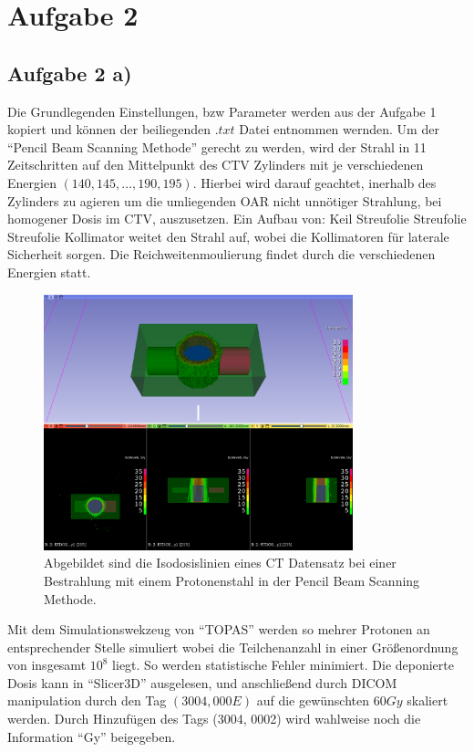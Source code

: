 \section{Aufgabe 2}
\subsection{Aufgabe 2 a)}
Die Grundlegenden Einstellungen, bzw Parameter werden aus der Aufgabe 1 kopiert und können der beiliegenden $.txt$ Datei entnommen wernden.
Um der \enquote{Pencil Beam Scanning Methode} gerecht zu werden, wird der Strahl in 11 Zeitschritten
auf den Mittelpunkt des CTV Zylinders mit je verschiedenen Energien $\left( 140, 145,...,190, 195 \right)$. 
Hierbei wird darauf geachtet, inerhalb des Zylinders zu agieren um die umliegenden OAR nicht unnötiger Strahlung, bei homogener Dosis im CTV, auszusetzen. 
Ein Aufbau von: \newpage Keil \to Streufolie \to Streufolie \to Streufolie \to Kollimator weitet den Strahl auf, wobei die Kollimatoren für laterale 
Sicherheit sorgen. Die Reichweitenmoulierung findet durch die verschiedenen Energien statt.
\begin{figure}
    \centering
    \includegraphics[width= 0.8\textwidth]{content/iso.png}
    \caption{Abgebildet sind die Isodosislinien eines CT Datensatz bei einer Bestrahlung mit einem Protonenstahl in der Pencil Beam Scanning
    Methode.}
    \label{fig:iso}
\end{figure}
Mit dem Simulationswekzeug von \enquote{TOPAS} werden so mehrer Protonen an entsprechender Stelle simuliert wobei die Teilchenanzahl in einer Größenordnung 
von insgesamt $10^8$ liegt. So werden statistische Fehler minimiert. Die deponierte Dosis kann in \enquote{Slicer3D} ausgelesen,
und anschließend durch DICOM manipulation durch den Tag $(3004, 000E)$ auf die gewünschten $60 Gy$ skaliert werden. 
Durch Hinzufügen des Tags (3004, 0002) wird wahlweise noch die Information \enquote{Gy} beigegeben.

